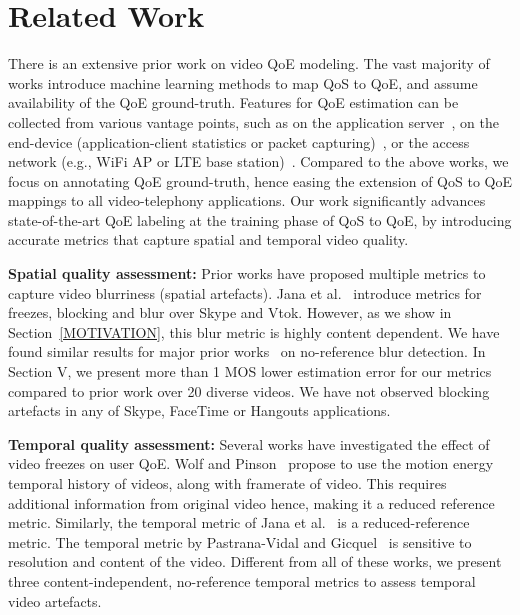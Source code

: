 \section{Related Work}
There is an extensive prior work on video QoE modeling. The vast majority of works \cite{aggarwal2014prometheus,balachandran2013developing,fiedler2010generic} introduce machine learning methods to map QoS to QoE, and assume availability of the QoE ground-truth. Features for QoE estimation can be collected from various vantage points, such as on the application server~\cite{balachandran2013developing}, on the end-device (application-client statistics or packet capturing)~\cite{zhang2012profiling,yu2014can,seufert2015survey,aggarwal2014prometheus,balachandran2012quest,chen2014qoe}, or the access network (e.g., WiFi AP or LTE base station)~\cite{chakraborty2016exbox,jana2016qoe,chen2006quantifying}. Compared to the above works, we focus on annotating QoE ground-truth, hence easing the extension of QoS to QoE mappings to all video-telephony applications. Our work significantly advances state-of-the-art QoE labeling at the training phase of QoS to QoE, by introducing accurate metrics that capture spatial and temporal video quality.

\noindent
\textbf{Spatial quality assessment:}  Prior works have proposed multiple metrics to capture video blurriness (spatial artefacts). Jana et al.~\cite{jana2016qoe} introduce metrics for freezes, blocking and blur over Skype and Vtok. However, as we show in Section~\ref{MOTIVATION}, this blur metric is highly content dependent. We have found similar results for major prior works~\cite{golestaneh2014no, mittal2012no,tong2004blur,marziliano2002no} on no-reference blur detection. In Section V, we present more than 1 MOS lower estimation error for our metrics compared to prior work over 20 diverse videos. We have not observed blocking artefacts in any of Skype, FaceTime or Hangouts applications.

\noindent
\textbf{Temporal quality assessment:} Several works \cite{wolf2009no, borer2010model, usman2017no, pastrana2006automatic} have investigated the effect of video freezes on user QoE. Wolf and Pinson~\cite{wolf2009no} propose to use the motion energy temporal history of videos, along with framerate of video. This requires additional information from original video hence, making it a reduced reference metric. Similarly, the temporal metric of Jana et al.~\cite{jana2016qoe} is a reduced-reference metric. The temporal metric by Pastrana-Vidal and Gicquel~\cite{pastrana2006automatic} is sensitive to resolution and content of the video. Different from all of these works, we present three content-independent, no-reference temporal metrics to assess temporal video artefacts.
